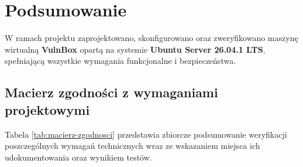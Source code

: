 \chapter{Podsumowanie}
\label{chap:podsumowanie}

W ramach projektu zaprojektowano, skonfigurowano oraz zweryfikowano maszynę wirtualną \textbf{VulnBox} opartą na systemie \textbf{Ubuntu Server 26.04.1 LTS}, spełniającą wszystkie wymagania funkcjonalne i bezpieczeństwa.

\section{Macierz zgodności z wymaganiami projektowymi}
\label{sec:macierz-zgodnosci}

Tabela \ref{tab:macierz-zgodnosci} przedstawia zbiorcze podsumowanie weryfikacji poszczególnych wymagań technicznych wraz ze wskazaniem miejsca ich udokumentowania oraz wynikiem testów.

